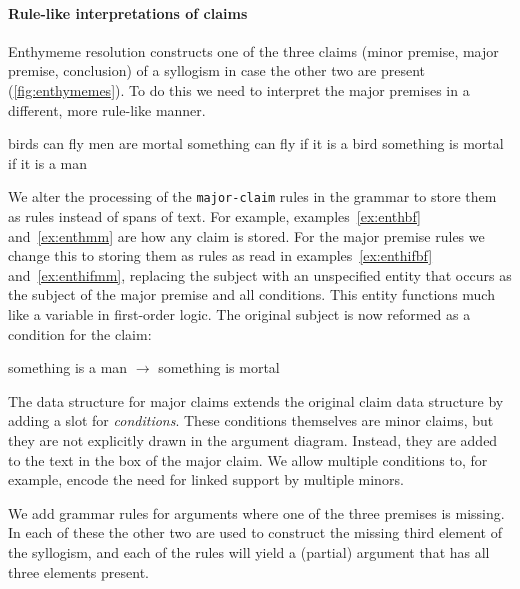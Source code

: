 \paragraph{Rule-like interpretations of claims}
Enthymeme resolution constructs one of the three claims (minor premise, major premise, conclusion) of a syllogism in case the other two are present (\autoref{fig:enthymemes}). To do this we need to interpret the major premises in a different, more rule-like manner.

\begin{exe}
    \ex\label{ex:enthbf} birds can fly
    \ex\label{ex:enthmm} men are mortal
    \ex\label{ex:enthifbf} something can fly if it is a bird
    \ex\label{ex:enthifmm} something is mortal if it is a man
\end{exe}

\noindent We alter the processing of the \texttt{major-claim} rules in the grammar to store them as rules instead of spans of text. For example, examples~\ref{ex:enthbf} and~\ref{ex:enthmm} are how any claim is stored. For the major premise rules we change this to storing them as rules as read in examples~\ref{ex:enthifbf} and~\ref{ex:enthifmm}, replacing the subject with an unspecified entity that occurs as the subject of the major premise and all conditions. This entity functions much like a variable in first-order logic. The original subject is now reformed as a condition for the claim:

\begin{exe}
    \ex something is a man $\to$ something is mortal
\end{exe}

The data structure for major claims  extends the original claim data structure by adding a slot for \emph{conditions}. These conditions themselves are minor claims, but they are not explicitly drawn in the argument diagram. Instead, they are added to the text in the box of the major claim. We allow multiple conditions to, for example, encode the need for linked support by multiple minors.

We add grammar rules for arguments where one of the three premises is missing. In each of these the other two are used to construct the missing third element of the syllogism, and each of the rules will yield a (partial) argument that has all three elements present.

